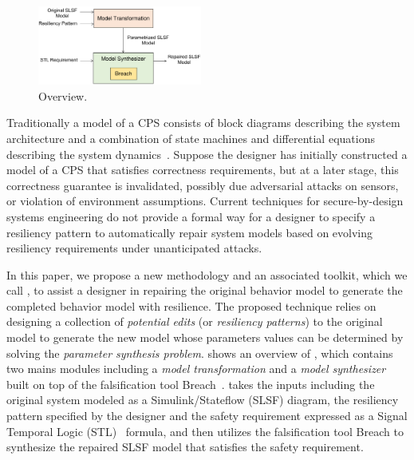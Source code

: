 %
\begin{figure}[t!]%
	\centering%
		\includegraphics[width=0.48\textwidth]{image/overview}%
	\caption{\toolreaffirm Overview.}%
\end{figure}%
Traditionally a model of a CPS consists of block diagrams describing the system architecture and a combination of state machines and differential equations describing the system dynamics~\cite{alur1995algorithmic}. Suppose the designer has initially constructed a model of a CPS that satisfies correctness requirements, but at a later stage, this correctness guarantee is invalidated, possibly due adversarial attacks on sensors, or violation of environment assumptions. Current techniques for secure-by-design systems engineering do not provide a formal way for a designer to specify a resiliency pattern to automatically repair system models based on evolving resiliency requirements under unanticipated attacks. 

In this paper, we propose a new methodology and an associated toolkit, which we call \toolreaffirm, to assist a designer in repairing the original behavior model to generate the completed behavior model with resilience. %
%
The proposed technique relies on designing a collection of \emph{potential edits} (or \emph{resiliency patterns}) to the original model to generate the new model whose parameters values can be determined by solving the \emph{parameter synthesis problem}. 
%
%
%
 shows an overview of \toolreaffirm, which contains two mains modules including a \emph{model transformation} and a \emph{model synthesizer} built on top of the falsification tool Breach~\cite{donze2010breach}.
\toolreaffirm takes the inputs including the original system modeled as a Simulink/Stateflow (SLSF) diagram, the resiliency pattern specified by the designer and the safety requirement expressed as a Signal Temporal Logic (STL)~\cite{maler2004monitoring} formula, and then utilizes the falsification tool Breach to synthesize the repaired SLSF model that satisfies the safety requirement.

